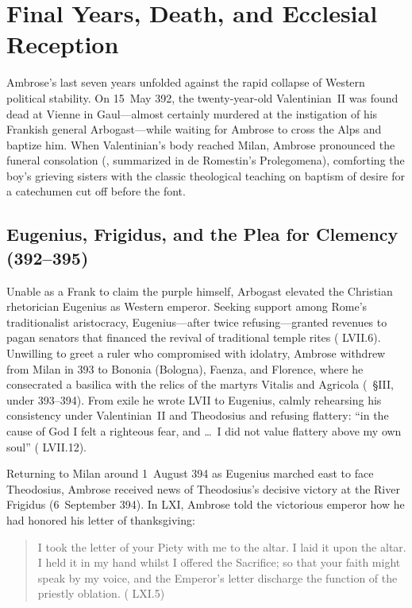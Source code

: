 \section{Final Years, Death, and Ecclesial Reception}

Ambrose's last seven years unfolded against the rapid collapse of Western political stability. On 15~May 392, the twenty-year-old Valentinian~II was found dead at Vienne in Gaul---almost certainly murdered at the instigation of his Frankish general Arbogast---while waiting for Ambrose to cross the Alps and baptize him. When Valentinian's body reached Milan, Ambrose pronounced the funeral consolation (, summarized in de Romestin's Prolegomena), comforting the boy's grieving sisters with the classic theological teaching on baptism of desire for a catechumen cut off before the font.

\subsection{Eugenius, Frigidus, and the Plea for Clemency (392--395)}

Unable as a Frank to claim the purple himself, Arbogast elevated the Christian rhetorician Eugenius as Western emperor. Seeking support among Rome's traditionalist aristocracy, Eugenius---after twice refusing---granted revenues to pagan senators that financed the revival of traditional temple rites ( LVII.6). Unwilling to greet a ruler who compromised with idolatry, Ambrose withdrew from Milan in 393 to Bononia (Bologna), Faenza, and Florence, where he consecrated a basilica with the relics of the martyrs Vitalis and Agricola (~\S III, under 393--394). From exile he wrote  LVII to Eugenius, calmly rehearsing his consistency under Valentinian~II and Theodosius and refusing flattery: ``in the cause of God I felt a righteous fear, and \ldots\ I did not value flattery above my own soul'' ( LVII.12).

Returning to Milan around 1~August 394 as Eugenius marched east to face Theodosius, Ambrose received news of Theodosius's decisive victory at the River Frigidus (6~September 394). In  LXI, Ambrose told the victorious emperor how he had honored his letter of thanksgiving:

\begin{quote}
I took the letter of your Piety with me to the altar. I laid it upon the altar. I held it in my hand whilst I offered the Sacrifice; so that your faith might speak by my voice, and the Emperor's letter discharge the function of the priestly oblation. ( LXI.5)
\end{quote}

